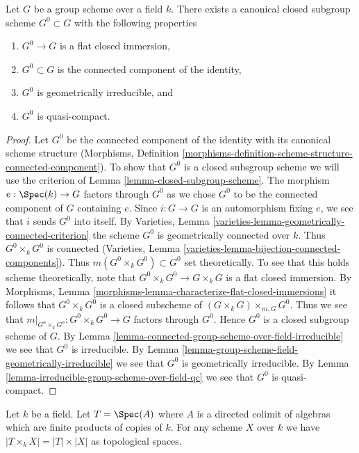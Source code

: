 \begin{proposition}
\label{proposition-connected-component}
Let $G$ be a group scheme over a field $k$. There exists a canonical closed
subgroup scheme $G^0 \subset G$ with the following properties
\begin{enumerate}
\item $G^0 \to G$ is a flat closed immersion,
\item $G^0 \subset G$ is the connected component of the identity,
\item $G^0$ is geometrically irreducible, and
\item $G^0$ is quasi-compact.
\end{enumerate}
\end{proposition}

\begin{proof}
Let $G^0$ be the connected component of the identity with its canonical
scheme structure (Morphisms, Definition
\ref{morphisms-definition-scheme-structure-connected-component}).
To show that $G^0$ is a closed subsgroup scheme we will use the
criterion of Lemma \ref{lemma-closed-subgroup-scheme}.
The morphism $e : \Spec(k) \to G$ factors through $G^0$ as we chose
$G^0$ to be the connected component of $G$ containing $e$.
Since $i : G \to G$ is an automorphism fixing $e$, we see that
$i$ sends $G^0$ into itself.
By Varieties, Lemma \ref{varieties-lemma-geometrically-connected-criterion}
the scheme $G^0$ is geometrically connected over $k$.
Thus $G^0 \times_k G^0$ is connected
(Varieties, Lemma \ref{varieties-lemma-bijection-connected-components}).
Thus $m(G^0 \times_k G^0) \subset G^0$ set theoretically.
To see that this holds scheme theoretically, note that
$G^0 \times_k G^0 \to G \times_k G$ is a flat closed immersion.
By Morphisms, Lemma \ref{morphisms-lemma-characterize-flat-closed-immersions}
it follows that $G^0 \times_k G^0$ is a closed subscheme of
$(G \times_k G) \times_{m, G} G^0$. Thus we see that
$m|_{G^0 \times_k G^0} : G^0 \times_k G^0 \to G$ factors through
$G^0$. Hence $G^0$ is a closed subgroup scheme of $G$.
By Lemma \ref{lemma-connected-group-scheme-over-field-irreducible}
we see that $G^0$ is irreducible. By
Lemma \ref{lemma-group-scheme-field-geometrically-irreducible}
we see that $G^0$ is geometrically irreducible. By
Lemma \ref{lemma-irreducible-group-scheme-over-field-qc}
we see that $G^0$ is quasi-compact.
\end{proof}

\begin{lemma}
\label{lemma-profinite-product-over-field}
Let $k$ be a field. Let $T = \Spec(A)$ where $A$ is a directed colimit of
algebras which are finite products of copies of $k$. For any scheme $X$
over $k$ we have $|T \times_k X| = |T| \times |X|$ as topological spaces.
\end{lemma}

